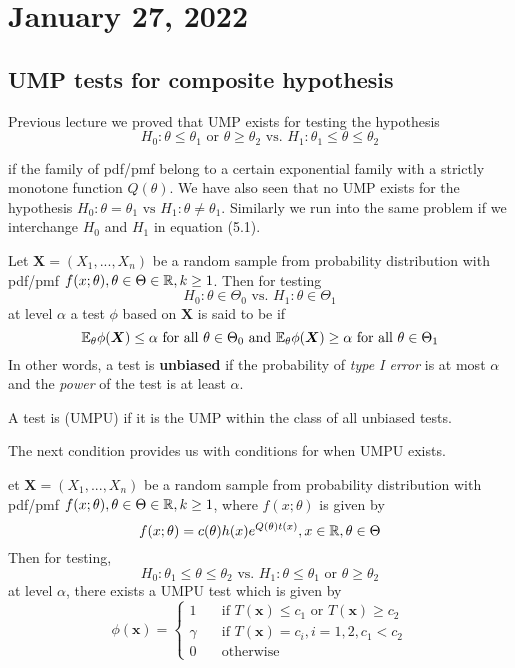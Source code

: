 \section{January 27, 2022}
\subsection{UMP tests for composite hypothesis}
Previous lecture we proved that UMP exists for testing the hypothesis 
\begin{equation}
    H_0: \theta \leq \theta_1 
    \text{ or } \theta \geq \theta_2
    \text{ vs. } H_1: \theta_1 \leq \theta \leq \theta_2
\end{equation}


if the family of pdf/pmf belong to a certain exponential family with a strictly monotone function $Q(\theta)$. 
We have also seen that no UMP exists for the hypothesis
$
H_0: \theta = \theta_1 \text{ vs }
H_1: \theta \neq \theta_1
$. 
Similarly we run into the same problem if we interchange $H_0$ and $H_1$ in equation (5.1).

\begin{definition}
Let $\boldsymbol{X} = (X_1,...,X_n)$ be a random sample from probability distribution with pdf/pmf $f(x;\theta), \theta \in \Theta \in \mathbb R, k \geq 1$. Then for testing
$$
H_0: \theta \in \Theta_0 \text{ vs. }
H_1: \theta \in \Theta_1
$$
at level $\alpha$ a test $\phi$ based on $\boldsymbol{X}$ is said to be  if
$$
\mathbb E_{\theta}\phi(\boldsymbol{X}) \leq \alpha \text{ for all } \theta \in \Theta_0
\text{ and }
\mathbb E_{\theta}\phi(\boldsymbol{X}) \geq \alpha \text{ for all } \theta \in \Theta_1
$$
In other words, a test is \textbf{unbiased} if the probability of \textit{type I error} is at most $\alpha$ and the \textit{power} of the test  is at least $\alpha$. 
\end{definition}

\begin{definition}[UMPU]
A test is  (UMPU) if it is the UMP within the class of all unbiased tests.
\end{definition}
The next condition provides us with conditions for when UMPU exists. 

\begin{theorem}
et $\boldsymbol{X} = (X_1,...,X_n)$ be a random sample from probability distribution with pdf/pmf $f(x;\theta), \theta \in \Theta \in \mathbb R, k \geq 1$, where $f(x;\theta)$ is given by
$$
f(x;\theta) = c(\theta)h(x)e^{Q(\theta)t(x)}, x \in \mathbb R, \theta \in \Theta
$$
Then for testing,
$$  H_0: \theta_1 \leq \theta \leq \theta_2
    \text{ vs. } H_1:
    \theta \leq \theta_1 
    \text{ or } \theta \geq \theta_2
$$
at level $\alpha$, there exists a UMPU test which is given by 
$$
\phi(\boldsymbol{x}) = 
    \begin{cases}
     1 \quad& \text{if } T(\boldsymbol{x}) \leq c_1 \text{ or }  T(\boldsymbol{x}) \geq c_2 \\
    \gamma & \text{if }  T(\boldsymbol{x}) = c_i, i=1,2, c_1 < c_2 \\
    0  & \text{otherwise}
    \end{cases}
$$
\end{theorem}